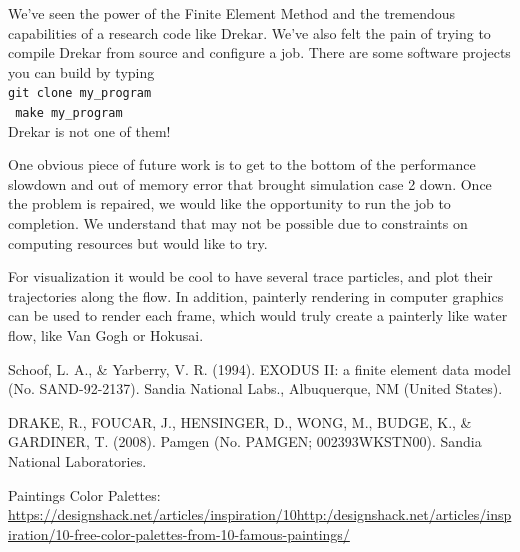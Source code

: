 \documentclass[11pt]{article} %
\newcommand{\tty}[1]{\texttt{#1}}
\begin{document}
We've seen the power of the Finite Element Method and the tremendous capabilities of 
a research code like Drekar.  
We've also felt the pain of trying to compile Drekar from source and configure a job.
There are some software projects you can build by typing\\
\tty{git clone my\_program}\\
\tty{ make my\_program} \\
Drekar is not one of them!

One obvious piece of future work is to get to the bottom of the performance slowdown 
and out of memory error that brought simulation case 2 down.
Once the problem is repaired, we would like the opportunity to run the job to completion.
We understand that may not be possible due to constraints on computing resources
but would like to try. 

For visualization it would be cool to have several trace particles, and plot their trajectories along the flow. In addition, painterly rendering in computer graphics can be used to render each frame, which would truly create a painterly like water flow, like Van Gogh or Hokusai.


\begin{thebibliography}{9}
Schoof, L. A., \& Yarberry, V. R. (1994). EXODUS II: a finite element data model (No. SAND-92-2137). Sandia National Labs., Albuquerque, NM (United States).

DRAKE, R., FOUCAR, J., HENSINGER, D., WONG, M., BUDGE, K., \& GARDINER, T. (2008). Pamgen (No. PAMGEN; 002393WKSTN00). Sandia National Laboratories.

Paintings Color Palettes: \url{https://designshack.net/articles/inspiration/10http:/designshack.net/articles/inspiration/10-free-color-palettes-from-10-famous-paintings/}

\end{thebibliography}
\end{document}
